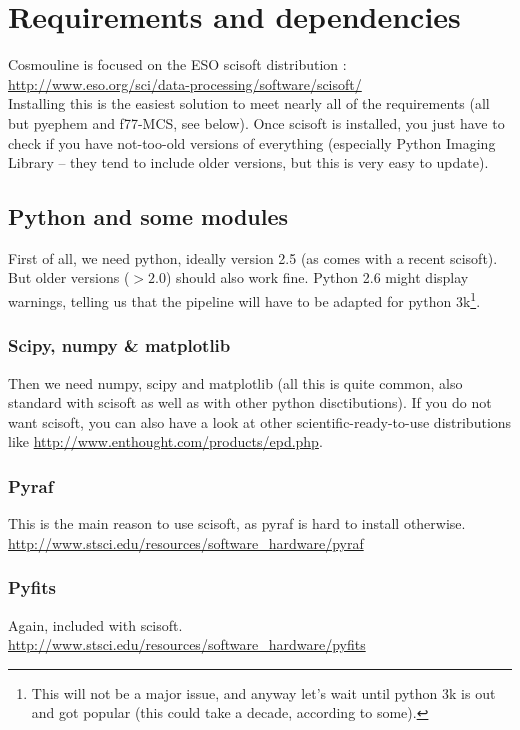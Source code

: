 
\section{Requirements and dependencies}


Cosmouline is focused on the ESO scisoft distribution : \\
\url{http://www.eso.org/sci/data-processing/software/scisoft/}\\
Installing this is the easiest solution to meet nearly all of the requirements (all but pyephem and f77-MCS, see below). Once scisoft is installed, you just have to check if you have not-too-old versions of everything (especially Python Imaging Library -- they tend to include older versions, but this is very easy to update).

\subsection{Python and some modules}

First of all, we need python, ideally version 2.5 (as comes with a recent scisoft). But older versions ($> 2.0$) should also work fine. Python 2.6 might display warnings, telling us that the pipeline will have to be adapted for python 3k\footnote{This will not be a major issue, and anyway let's wait until python 3k is out and got popular (this could take a decade, according to some).}.

\subsubsection{Scipy, numpy \& matplotlib}

Then we need numpy, scipy and matplotlib (all this is quite common, also standard with scisoft as well as with other python disctibutions). If you do not want scisoft, you can also have a look at other scientific-ready-to-use distributions like \url{http://www.enthought.com/products/epd.php}.

\subsubsection{Pyraf}
This is the main reason to use scisoft, as pyraf is hard to install otherwise.\\
\url{http://www.stsci.edu/resources/software_hardware/pyraf}

\subsubsection{Pyfits}
Again, included with scisoft.\\
\url{http://www.stsci.edu/resources/software_hardware/pyfits}

